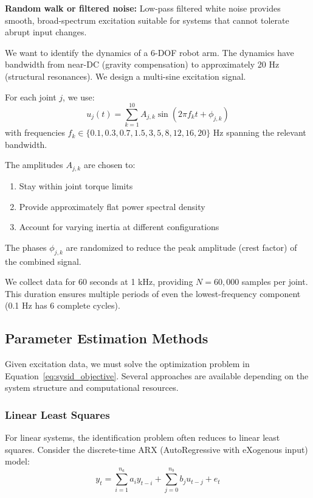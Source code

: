 \textbf{Random walk or filtered noise:} Low-pass filtered white noise provides smooth, broad-spectrum excitation suitable for systems that cannot tolerate abrupt input changes.

\begin{example}
\label{ex:robot_arm_excitation}
We want to identify the dynamics of a 6-DOF robot arm. The dynamics have bandwidth from near-DC (gravity compensation) to approximately 20 Hz (structural resonances). We design a multi-sine excitation signal.

For each joint $j$, we use:
\begin{equation}
u_j(t) = \sum_{k=1}^{10} A_{j,k} \sin(2\pi f_k t + \phi_{j,k})
\end{equation}
with frequencies $f_k \in \{0.1, 0.3, 0.7, 1.5, 3, 5, 8, 12, 16, 20\}$ Hz spanning the relevant bandwidth.

The amplitudes $A_{j,k}$ are chosen to:
\begin{enumerate}
    \item Stay within joint torque limits
    \item Provide approximately flat power spectral density
    \item Account for varying inertia at different configurations
\end{enumerate}

The phases $\phi_{j,k}$ are randomized to reduce the peak amplitude (crest factor) of the combined signal.

We collect data for 60 seconds at 1 kHz, providing $N = 60,000$ samples per joint. This duration ensures multiple periods of even the lowest-frequency component (0.1 Hz has 6 complete cycles).
\end{example}

\subsection{Parameter Estimation Methods}

Given excitation data, we must solve the optimization problem in Equation~\ref{eq:sysid_objective}. Several approaches are available depending on the system structure and computational resources.

\subsubsection{Linear Least Squares}

For linear systems, the identification problem often reduces to linear least squares. Consider the discrete-time ARX (AutoRegressive with eXogenous input) model:
\begin{equation}
y_t = \sum_{i=1}^{n_a} a_i y_{t-i} + \sum_{j=0}^{n_b} b_j u_{t-j} + e_t
\end{equation}

